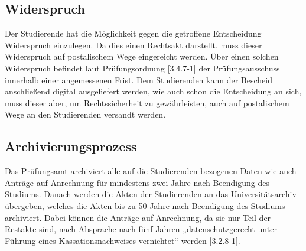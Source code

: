 \subsection{Widerspruch}
Der Studierende hat die Möglichkeit gegen die getroffene Entscheidung Widerspruch einzulegen. Da dies einen Rechtsakt darstellt, muss dieser Widerspruch auf postalischem Wege eingereicht werden. Über einen solchen Widerspruch befindet laut Prüfungsordnung [3.4.7-1] der Prüfungsausschuss innerhalb einer angemessenen Frist. Dem Studierenden kann der Bescheid anschließend digital ausgeliefert werden, wie auch schon die Entscheidung an sich, muss dieser aber, um Rechtssicherheit zu gewährleisten, auch auf postalischem Wege an den Studierenden versandt werden.

\subsection{Archivierungsprozess}
Das Prüfungsamt archiviert alle auf die Studierenden bezogenen Daten wie auch Anträge auf Anrechnung für mindestens zwei Jahre nach Beendigung des Studiums. Danach werden die Akten der Studierenden an das Universitätsarchiv übergeben, welches die Akten bis zu 50 Jahre nach Beendigung des Studiums archiviert. Dabei können die Anträge auf Anrechnung, da sie nur Teil der Restakte sind, nach Absprache nach fünf Jahren „datenschutzgerecht unter Führung eines Kassationsnachweises vernichtet“ werden [3.2.8-1].


